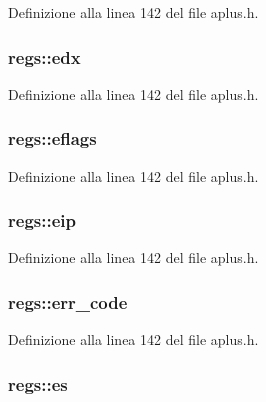 Definizione alla linea 142 del file aplus.\+h.

\hypertarget{structregs_a63133abf1974301855fe69ef4ee70ef3}{
\subsubsection[{edx}]{ regs\+::edx}}\label{structregs_a63133abf1974301855fe69ef4ee70ef3}


Definizione alla linea 142 del file aplus.\+h.

\hypertarget{structregs_a795e8ffcd28d56b617a2d535b2d1394c}{
\subsubsection[{eflags}]{ regs\+::eflags}}\label{structregs_a795e8ffcd28d56b617a2d535b2d1394c}


Definizione alla linea 142 del file aplus.\+h.

\hypertarget{structregs_a69756a0c0f29041c01160de72c4163b8}{
\subsubsection[{eip}]{ regs\+::eip}}\label{structregs_a69756a0c0f29041c01160de72c4163b8}


Definizione alla linea 142 del file aplus.\+h.

\hypertarget{structregs_a938e9e8adf0d430fefc20bea83650718}{
\subsubsection[{err\+\_\+code}]{ regs\+::err\+\_\+code}}\label{structregs_a938e9e8adf0d430fefc20bea83650718}


Definizione alla linea 142 del file aplus.\+h.

\hypertarget{structregs_aede6adc8400a3e68071ad7a038fbbcc9}{
\subsubsection[{es}]{ regs\+::es}}\label{structregs_aede6adc8400a3e68071ad7a038fbbcc9}



